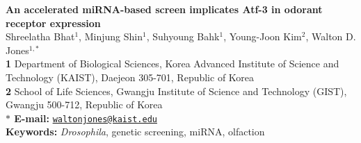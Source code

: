 \begin{flushleft}
{\Large
\textbf{An accelerated miRNA-based screen implicates Atf-3 in odorant receptor
expression}
}
\\
Shreelatha Bhat$^{1}$, 
Minjung Shin$^{1}$, 
Suhyoung Bahk$^{1}$, 
Young-Joon Kim$^{2}$, 
Walton D. Jones$^{1,\ast}$
\\
{\bf 1} Department of Biological Sciences, Korea Advanced Institute of Science and Technology (KAIST), Daejeon 305-701, Republic of Korea
\\
{\bf 2} School of Life Sciences, Gwangju Institute of Science and Technology (GIST), Gwangju 500-712, Republic of Korea
\\
{\bf $\ast$ E-mail:} \href{mailto:waltonjones@kaist.edu}{\nolinkurl{waltonjones@kaist.edu}}
\\
{\bf Keywords:} \emph{Drosophila}, genetic screening, miRNA, olfaction
\end{flushleft}